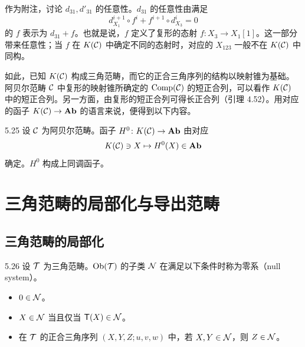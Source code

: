 作为附注，讨论 $d_{31}, d'_{31}$ 的任意性。$d_{31}$ 的任意性由满足
\[
  d_{X_1}^{i+1}\circ f^i + f^{i+1}\circ d_{X_3}^i = 0
\]
的 $f$ 表示为 $d_{31}+f$。也就是说，$f$ 定义了复形的态射 $f\colon X_3\to X_1[1]$。这一部分带来任意性；当 $f$ 在 $K(\mathcal{C})$ 中确定不同的态射时，对应的 $X_{123}$ 一般不在 $K(\mathcal{C})$ 中同构。

如此，已知 $K(\mathcal{C})$ 构成三角范畴，而它的正合三角序列的结构以映射锥为基础。阿贝尔范畴 $\mathcal{C}$ 中复形的映射锥所确定的 $\operatorname{Comp}(\mathcal{C})$ 的短正合列，可以看作 $K(\mathcal{C})$ 中的短正合列。另一方面，由复形的短正合列可得长正合列（引理 4.52）。用对应的函子 $K(\mathcal{C})\to\mathbf{Ab}$ 的语言来说，便得到以下内容。

\begin{proposition}{5.25}
设 $\mathcal{C}$ 为阿贝尔范畴。函子 $H^0\colon K(\mathcal{C})\to\mathbf{Ab}$ 由对应
\[
  K(\mathcal{C})\ni X \mapsto H^0(X)\in\mathbf{Ab}
\]
确定。$H^0$ 构成上同调函子。
\end{proposition}


\section{三角范畴的局部化与导出范畴}

\subsection{三角范畴的局部化}

\begin{definition}{5.26}
设 $\mathcal{T}$ 为三角范畴。$\operatorname{Ob}(\mathcal{T})$ 的子类 $\mathcal{N}$ 在满足以下条件时称为零系（null system）。
\begin{itemize}
  \item $0\in\mathcal{N}$。
  \item $X\in\mathcal{N}$ 当且仅当 $\mathsf{T}(X)\in\mathcal{N}$。
  \item 在 $\mathcal{T}$ 的正合三角序列 $(X,Y,Z;u,v,w)$ 中，若 $X,Y\in\mathcal{N}$，则 $Z\in\mathcal{N}$。
\end{itemize}
\end{definition}


